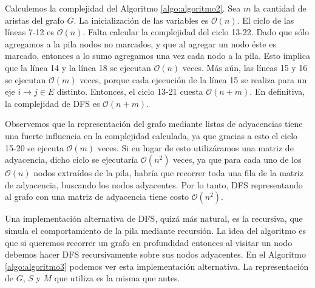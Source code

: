 Calculemos la complejidad del Algoritmo \ref{algo:algoritmo2}. Sea $m$ la cantidad de aristas del grafo $G$. La inicialización de las variables es $\mathcal{O}(n)$. El ciclo de las líneas 7-12 es $\mathcal{O}(n)$. Falta calcular la complejidad del ciclo 13-22. Dado que sólo agregamos a la pila nodos no marcados, y que al agregar un nodo éste es marcado, entonces a lo sumo agregamos una vez cada nodo a la pila. Esto implica que la línea 14 y la línea 18 se ejecutan $\mathcal{O}(n)$ veces. Más aún, las líneas 15 y 16 se ejecutan $\mathcal{O}(m)$ veces, porque cada ejecución de la línea 15 se realiza para un eje $i \to j \in E$ distinto. Entonces, el ciclo 13-21 cuesta $\mathcal{O}(n + m)$. En definitiva, la complejidad de DFS es $\mathcal{O}(n + m)$. 

Observemos que la representación del grafo mediante listas de adyacencias tiene una fuerte influencia en la complejidad calculada, ya que gracias a esto el ciclo 15-20 se ejecuta $\mathcal{O}(m)$ veces. Si en lugar de esto utilizáramos una matriz de adyacencia, dicho ciclo se ejecutaría $\mathcal{O}(n^2)$ veces, ya que para cada uno de los $\mathcal{O}(n)$ nodos extraídos de la pila, habría que recorrer toda una fila de la matriz de adyacencia, buscando los nodos adyacentes. Por lo tanto, DFS representando al grafo con una matriz de adyacencia tiene costo $\mathcal{O}(n^2)$. 

Una implementación alternativa de DFS, quizá más natural, es la recursiva, que simula el comportamiento de la pila mediante recursión. La idea del algoritmo es que si queremos recorrer un grafo en profundidad entonces al visitar un nodo debemos hacer DFS recursivamente sobre sus nodos adyacentes. En el Algoritmo \ref{algo:algoritmo3} podemos ver esta implementación alternativa. La representación de $G$, $S$ y $M$ que utiliza es la misma que antes.

\begin{algorithm}
	\DontPrintSemicolon
 	\BlankLine
\caption{$\textsc{Recursive-DFS}$}
\label{algo:algoritmo3}
\end{algorithm}

\begin{algorithm}
	\DontPrintSemicolon
	\Output{-}
 	\BlankLine
\caption{$\textsc{DFS-Visit}$}
\label{algo:algoritmo4}
\end{algorithm}

